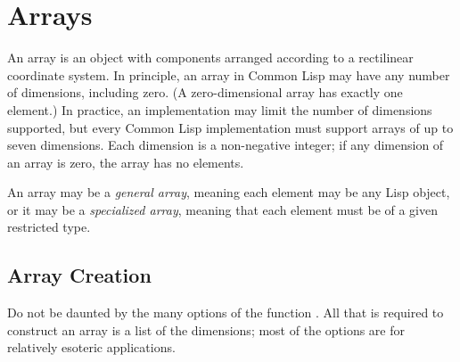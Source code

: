 
\clearpage\def\pagestatus{FINAL PROOF}

\ifx \rulang\Undef

\chapter{Arrays}

An array is an object with components arranged according
to a rectilinear coordinate system.
In principle, an
array in Common Lisp may have any number of dimensions, including zero.
(A zero-dimensional array has exactly one element.)
In practice, an implementation may limit the number of dimensions
supported, but
every Common Lisp implementation must support arrays of up to
seven dimensions.
Each dimension is a non-negative integer; if any dimension of an array is zero,
the array has no elements.

An array may be a \emph{general array}, meaning each element may be any Lisp
object, or it may be a \emph{specialized array}, meaning that each element
must be of a given restricted type.

\section{Array Creation}

Do not be daunted by the many options of the function .
All that is required to construct an array is a list of
the dimensions; most of the options are for relatively esoteric
applications.

